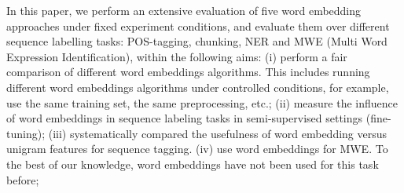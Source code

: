 In this paper, we perform an extensive evaluation of five word embedding approaches under fixed experiment conditions, and evaluate them over different sequence labelling tasks: POS-tagging, chunking, 
NER and MWE (Multi Word Expression Identification), 
within the following aims:
(i) perform a fair comparison of different word embeddings
algorithms. This includes running different word embeddings algorithms under controlled conditions, for example, use the same training set, the same preprocessing, etc.;
(ii) measure the influence of word embeddings in sequence labeling tasks in semi-supervised settings (fine-tuning);
(iii) systematically compared the usefulness of word embedding versus
unigram features for sequence tagging.
(iv) use word embeddings for MWE. To the best of our knowledge, 
word embeddings have not been used for this task before;



